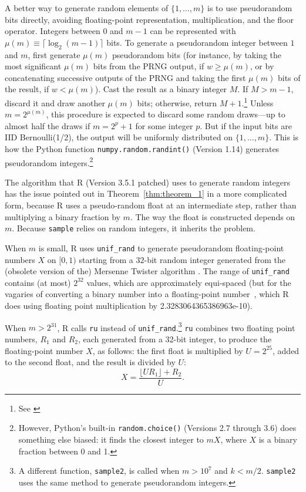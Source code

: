 \documentclass[12pt]{article}
\begin{document}
A better way to generate random elements of $\{1, \dots, m\}$ is to use pseudorandom bits directly,
avoiding floating-point representation, multiplication, and the floor operator. 
Integers between $0$ and $m-1$ can be represented with $\mu(m) \equiv \lceil \log_2(m-1) \rceil$ bits. 
To generate a pseudorandom integer between $1$ and $m$, first generate 
$\mu(m)$ pseudorandom bits (for instance, by taking the most significant $\mu(m)$ bits from the PRNG output, if $w \ge \mu(m)$, or by concatenating successive outputs of the PRNG and taking the
first $\mu(m)$ bits of the result, if $w < \mu(m)$).
Cast the result as a binary integer $M$.  
If $M > m-1$, discard it and draw another $\mu(m)$ bits; otherwise, return $M+1$.\footnote{%
   See \citet[p.114]{knuth_art_1997}
}
Unless $m = 2^{\mu(m)}$, this procedure is expected to discard some random draws---up to almost 
half the draws if $m = 2^p+1$ for some integer $p$.
But if the input bits are IID Bernoulli(1/2), the output will be uniformly distributed on $\{1, \ldots, m\}$.
This is how the Python function \texttt{numpy.random.randint()} (Version 1.14) generates pseudorandom integers.\footnote{%
  However, Python's built-in \texttt{random.choice()} (Versions 2.7 through 3.6) does 
  something else biased: it finds the closest integer to $mX$, where $X$ is a binary fraction 
  between 0 and 1.
}

The algorithm that R (Version 3.5.1 patched) \citep{R_2018} uses to generate random integers
has the issue pointed out in Theorem~\ref{thm:theorem_1} in a more complicated form, 
because R uses a pseudo-random float at an intermediate step, rather than multiplying a binary fraction
by $m$.
The way the float is constructed depends on $m$.
Because \texttt{sample} relies on random integers, it inherits the problem.

When $m$ is small, R uses \texttt{unif\_rand} to generate pseudorandom floating-point 
numbers $X$ on $[0, 1)$ starting from a $32$-bit random integer generated from the
(obsolete version of the) Mersenne Twister algorithm \citep{mt1998}.
The range of \texttt{unif\_rand} contains 
(at most) $2^{32}$ values, which are approximately equi-spaced (but for the vagaries of converting
a binary number into a floating-point number~\citep{goldberg91}, which
R does using floating point multiplication by 2.3283064365386963e-10).

When $m > 2^{31}$, R calls \texttt{ru} instead of \texttt{unif\_rand}.\footnote{
   A different function, \texttt{sample2}, is called when $m > 10^7$ and $k < m/2$.
\texttt{sample2} uses the same method to generate pseudorandom integers.
}
\texttt{ru} combines two floating point numbers, $R_1$ and $R_2$, each generated from a 32-bit integer, 
to produce the floating-point number $X$, as follows:
the first float is multiplied by $U = 2^{25}$, added to the second float, and the result is divided by
$U$:
$$ X = \frac{\lfloor U R_1 \rfloor + R_2}{U}.$$
\end{document}
